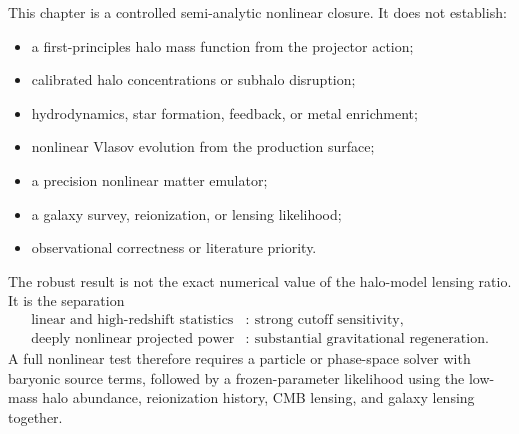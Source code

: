 This chapter is a controlled semi-analytic nonlinear closure.  It does not establish:
\begin{itemize}
 \item a first-principles halo mass function from the projector action;
 \item calibrated halo concentrations or subhalo disruption;
 \item hydrodynamics, star formation, feedback, or metal enrichment;
 \item nonlinear Vlasov evolution from the production surface;
 \item a precision nonlinear matter emulator;
 \item a galaxy survey, reionization, or lensing likelihood;
 \item observational correctness or literature priority.
\end{itemize}

The robust result is not the exact numerical value of the halo-model lensing ratio.  It is the separation
\begin{equation}
 \boxed{
 \begin{aligned}
 \text{linear and high-redshift statistics}
 &:\ \text{strong cutoff sensitivity},\\
 \text{deeply nonlinear projected power}
 &:\ \text{substantial gravitational regeneration}.
 \end{aligned}}
 \label{eq:nlh-observable-separation}
\end{equation}
A full nonlinear test therefore requires a particle or phase-space solver with baryonic source terms, followed by a frozen-parameter likelihood using the low-mass halo abundance, reionization history, CMB lensing, and galaxy lensing together.
